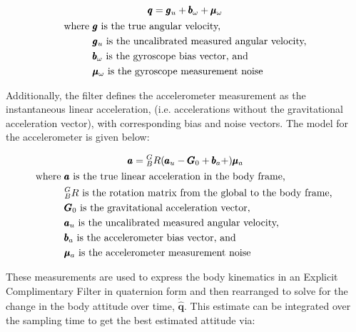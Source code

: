 \begin{gather} \label{eq:mahony_gyroscope_model}
    \pmb{q} = \pmb{g}_u + \pmb{b}_\omega + \pmb{\mu}_\omega \\
    \begin{aligned}
        \text{where } &\pmb{g} \text{ is the true angular velocity,} \\
                      &\pmb{g}_u \text{ is the uncalibrated measured angular velocity,} \\
                      &\pmb{b}_\omega \text{ is the gyroscope bias vector, and}  \\
                      &\pmb{\mu}_\omega \text{ is the gyroscope measurement noise}
    \end{aligned} \notag
\end{gather}

Additionally, the filter defines the accelerometer measurement as the instantaneous linear acceleration, (i.e. accelerations without the gravitational acceleration vector), with corresponding bias and noise vectors.
The model for the accelerometer is given below:

\begin{gather} \label{eq:mahony_accelerometer_model}
    \pmb{a} = {}^G_B R (\pmb{a}_u - \pmb{G}_0 + \pmb{b}_a + )\pmb{\mu}_a \\
    \begin{aligned}
        \text{where } &\pmb{a} \text{ is the true linear acceleration in the body frame,} \\
                      &{}^G_B R \text{ is the rotation matrix from the global to the body frame, } \\
                      &\pmb{G}_0 \text{ is the gravitational acceleration vector,} \\
                      &\pmb{a}_u \text{ is the uncalibrated measured angular velocity, } \\
                      &\pmb{b}_a \text{ is the accelerometer bias vector, and}  \\
                      &\pmb{\mu}_a \text{ is the accelerometer measurement noise}
    \end{aligned} \notag
\end{gather}

These measurements are used to express the body kinematics in an Explicit Complimentary Filter in quaternion form and then rearranged to solve for the change in the body attitude over time, $\pmb{\dot{\hat{q}}}$.
This estimate can be integrated over the sampling time to get the best estimated attitude via:

